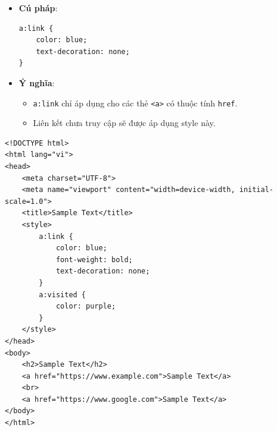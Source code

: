 \documentclass[11pt,oneside]{book}
\newcommand{\codeinline}[1]{\textcolor{accentOrange}{\texttt{#1}}}
\begin{document}
\begin{conceptBox}
\begin{itemize}[leftmargin=1.5em, itemsep=3pt, parsep=0pt]
    \item \textbf{Cú pháp}:
    \begin{codeWindow}
\begin{lstlisting}[language=CSS3]
a:link {
    color: blue;
    text-decoration: none;
}
\end{lstlisting}
    \end{codeWindow}
    \item \textbf{Ý nghĩa}:
    \begin{itemize}[leftmargin=1.2em, itemsep=2pt]
        \item \codeinline{a:link} chỉ áp dụng cho các thẻ \codeinline{<a>} có thuộc tính \codeinline{href}.
        \item Liên kết chưa truy cập sẽ được áp dụng style này.
    \end{itemize}
\end{itemize}
\end{conceptBox}

\begin{codeWindow}
\begin{lstlisting}[language=HTML5]
<!DOCTYPE html>
<html lang="vi">
<head>
    <meta charset="UTF-8">
    <meta name="viewport" content="width=device-width, initial-scale=1.0">
    <title>Sample Text</title>
    <style>
        a:link {
            color: blue;
            font-weight: bold;
            text-decoration: none;
        }
        a:visited {
            color: purple;
        }
    </style>
</head>
<body>
    <h2>Sample Text</h2>
    <a href="https://www.example.com">Sample Text</a>  
    <br>
    <a href="https://www.google.com">Sample Text</a>
</body>
</html>
\end{lstlisting}
\end{codeWindow}
\end{document}

